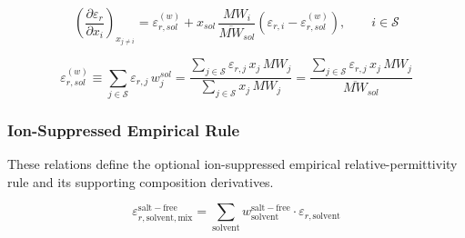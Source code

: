 \documentclass[12pt, letterpaper]{article}
\begin{document}
\begin{equation}
    \left(\frac{\partial \varepsilon_{r}}{\partial x_{i}}\right)_{x_{j\neq i}}
    =
    \varepsilon_{r,sol}^{(w)}
    +
    x_{sol}\,\frac{MW_{i}}{\overline{MW}_{sol}}
    \left(\varepsilon_{r,i}-\varepsilon_{r,sol}^{(w)}\right),
    \qquad i\in\mathcal S
    \label{eq:depsr_dxi_combo}
\end{equation}


\begin{equation}
    \varepsilon_{r,sol}^{(w)} \equiv \sum_{j\in\mathcal S}\varepsilon_{r,j}\,w_{j}^{sol} = \frac{\sum_{j\in\mathcal S}\varepsilon_{r,j}\,x_{j}\,MW_{j}}{\sum_{j\in\mathcal S}x_{j}\,MW_{j}} = \frac{\sum_{j\in\mathcal S}\varepsilon_{r,j}\,x_{j}\,MW_{j}}{\overline{MW}_{sol}}
    \label{eq:epsr_solvent_mass}
\end{equation}

\subsubsection{Ion-Suppressed Empirical Rule}

These relations define the optional ion-suppressed empirical relative-permittivity rule and its supporting composition derivatives.

\begin{equation}
    \varepsilon_{r,\mathrm{solvent,mix}}^{\mathrm{salt-free}}=\sum_{\mathrm{solvent}}w_{\mathrm{solvent}}^{\mathrm{salt-free}}\cdot\varepsilon_{r,\mathrm{solvent}}
    \label{eq:epsr_salt_free}
\end{equation}

\end{document}
